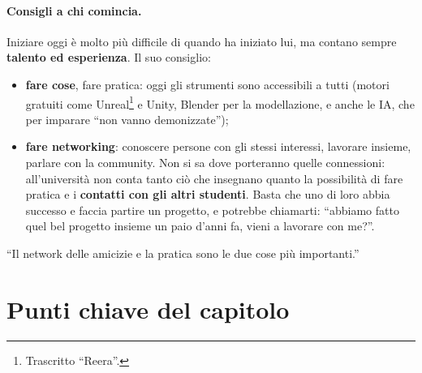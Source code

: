 \paragraph{Consigli a chi comincia.} Iniziare oggi è molto più difficile di quando
ha iniziato lui, ma contano sempre \textbf{talento ed esperienza}. Il suo consiglio:
\begin{itemize}
  \item \textbf{fare cose}, fare pratica: oggi gli strumenti sono accessibili a
        tutti (motori gratuiti come Unreal\footnote{Trascritto ``Reera''.} e
        Unity, Blender per la modellazione, e anche le IA, che per imparare
        ``non vanno demonizzate'');
  \item \textbf{fare networking}: conoscere persone con gli stessi interessi,
        lavorare insieme, parlare con la community. Non si sa dove porteranno quelle
        connessioni: all'università non conta tanto ciò che insegnano quanto la
        possibilità di fare pratica e i \textbf{contatti con gli altri studenti}.
        Basta che uno di loro abbia successo e faccia partire un progetto, e potrebbe
        chiamarti: ``abbiamo fatto quel bel progetto insieme un paio d'anni fa,
        vieni a lavorare con me?''.
\end{itemize}
``Il network delle amicizie e la pratica sono le due cose più importanti.''

\section*{Punti chiave del capitolo}


